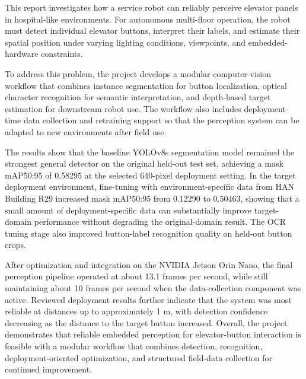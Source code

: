 This report investigates how a service robot can reliably perceive elevator
panels in hospital-like environments. For autonomous multi-floor operation, the
robot must detect individual elevator buttons, interpret their labels, and
estimate their spatial position under varying lighting conditions, viewpoints,
and embedded-hardware constraints.

To address this problem, the project develops a modular computer-vision
workflow that combines instance segmentation for button localization, optical
character recognition for semantic interpretation, and depth-based target
estimation for downstream robot use. The workflow also includes
deployment-time data collection and retraining support so that the perception
system can be adapted to new environments after field use.

The results show that the baseline YOLOv8s segmentation model remained the
strongest general detector on the original held-out test set, achieving a mask
mAP50:95 of 0.58295 at the selected 640-pixel deployment setting. In the
target deployment environment, fine-tuning with environment-specific data from
HAN Building R29 increased mask mAP50:95 from 0.12290 to 0.50463, showing that
a small amount of deployment-specific data can substantially improve
target-domain performance without degrading the original-domain result. The OCR
tuning stage also improved button-label recognition quality on held-out button
crops.

After optimization and integration on the NVIDIA Jetson Orin Nano, the final
perception pipeline operated at about 13.1 frames per second, while still
maintaining about 10 frames per second when the data-collection component was
active. Reviewed deployment results further indicate that the system was most
reliable at distances up to approximately 1 m, with detection confidence
decreasing as the distance to the target button increased. Overall, the project
demonstrates that reliable embedded perception for elevator-button interaction
is feasible with a modular workflow that combines detection, recognition,
deployment-oriented optimization, and structured field-data collection for
continued improvement.
